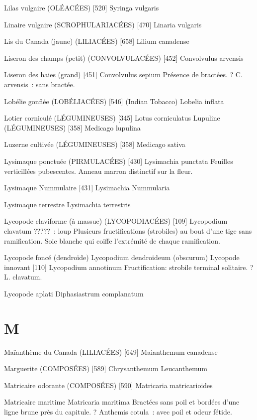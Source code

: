 Lilas vulgaire (OLÉACÉES)  [520]
				Syringa vulgaris

Linaire vulgaire (SCROPHULARIACÉES)  [470]
				Linaria vulgaris

Lis du Canada (jaune) (LILIACÉES)  [658]
				Lilium canadense

Liseron des champs (petit) (CONVOLVULACÉES)  [452]
				Convolvulus arvensis

Liseron des haies (grand)  [451]
				Convolvulus sepium
Présence de bractées. ? C. arvensis : sans bractée.

Lobélie gonflée (LOBÉLIACÉES)  [546] (Indian Tobacco)
				Lobelia inflata

Lotier corniculé (LÉGUMINEUSES)  [345]
				Lotus corniculatus
Lupuline (LÉGUMINEUSES)  [358]
				Medicago lupulina

Luzerne cultivée (LÉGUMINEUSES)  [358]
				Medicago sativa

Lysimaque ponctuée (PIRMULACÉES)  [430]
				Lysimachia punctata
Feuilles verticillées pubescentes.
Anneau marron distinctif sur la fleur.

Lysimaque Nummulaire  [431]
				Lysimachia Nummularia

Lysimaque terrestre
				Lysimachia terrestris

Lycopode claviforme (à massue) (LYCOPODIACÉES)  [109]
				Lycopodium clavatum
????? : loup
Plusieurs fructifications (strobiles) au bout d’une tige sans ramification.
Soie blanche qui coiffe l’extrémité de chaque ramification.

Lycopode foncé (dendroïde) 
				Lycopodium dendroideum (obscurum)
Lycopode innovant  [110]
				Lycopodium annotinum
Fructification: strobile terminal solitaire.
? L. clavatum.

Lycopode aplati
				Diphasiastrum complanatum

\chapter*{M}

Maïanthème du Canada (LILIACÉES)  [649]
				Maianthemum canadense

Marguerite (COMPOSÉES)  [589]
				Chrysanthemum Leucanthemum

Matricaire odorante (COMPOSÉES)  [590]
				Matricaria matricarioides

Matricaire maritime
				Matricaria maritima
Bractées sans poil et bordées d’une ligne brune près du capitule.
? Anthemis cotula : avec poil et odeur fétide.

